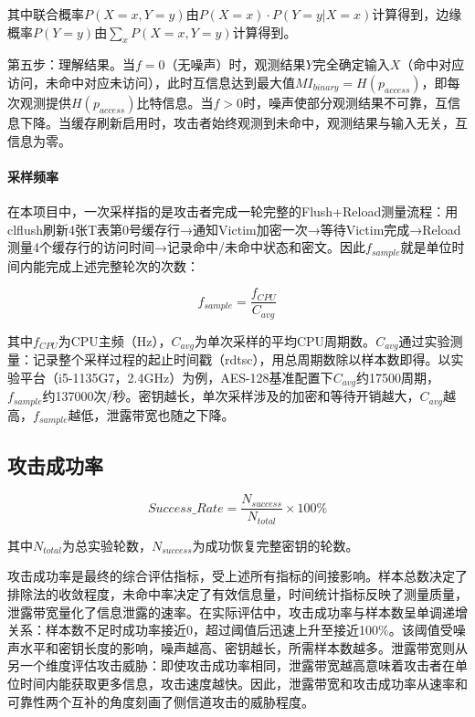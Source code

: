 其中联合概率$P(X=x, Y=y)$由$P(X=x) \cdot P(Y=y|X=x)$计算得到，边缘概率$P(Y=y)$由$\sum_x P(X=x, Y=y)$计算得到。

第五步：理解结果。当$f=0$（无噪声）时，观测结果$Y$完全确定输入$X$（命中对应访问，未命中对应未访问），此时互信息达到最大值$MI_{binary} = H(p_{access})$，即每次观测提供$H(p_{access})$比特信息。当$f>0$时，噪声使部分观测结果不可靠，互信息下降。当缓存刷新启用时，攻击者始终观测到未命中，观测结果与输入无关，互信息为零。

\paragraph{采样频率}

在本项目中，一次采样指的是攻击者完成一轮完整的Flush+Reload测量流程：用clflush刷新4张T表第0号缓存行→通知Victim加密一次→等待Victim完成→Reload测量4个缓存行的访问时间→记录命中/未命中状态和密文。因此$f_{sample}$就是单位时间内能完成上述完整轮次的次数：

\begin{equation}
f_{sample} = \frac{f_{CPU}}{C_{avg}}
\end{equation}

其中$f_{CPU}$为CPU主频（Hz），$C_{avg}$为单次采样的平均CPU周期数。$C_{avg}$通过实验测量：记录整个采样过程的起止时间戳（rdtsc），用总周期数除以样本数即得。以实验平台（i5-1135G7，2.4GHz）为例，AES-128基准配置下$C_{avg}$约17500周期，$f_{sample}$约137000次/秒。密钥越长，单次采样涉及的加密和等待开销越大，$C_{avg}$越高，$f_{sample}$越低，泄露带宽也随之下降。

\subsection{攻击成功率}

\begin{equation}
Success\_Rate = \frac{N_{success}}{N_{total}} \times 100\%
\end{equation}

其中$N_{total}$为总实验轮数，$N_{success}$为成功恢复完整密钥的轮数。

攻击成功率是最终的综合评估指标，受上述所有指标的间接影响。样本总数决定了排除法的收敛程度，未命中率决定了有效信息量，时间统计指标反映了测量质量，泄露带宽量化了信息泄露的速率。在实际评估中，攻击成功率与样本数呈单调递增关系：样本数不足时成功率接近0，超过阈值后迅速上升至接近100\%。该阈值受噪声水平和密钥长度的影响，噪声越高、密钥越长，所需样本数越多。泄露带宽则从另一个维度评估攻击威胁：即使攻击成功率相同，泄露带宽越高意味着攻击者在单位时间内能获取更多信息，攻击速度越快。因此，泄露带宽和攻击成功率从速率和可靠性两个互补的角度刻画了侧信道攻击的威胁程度。


